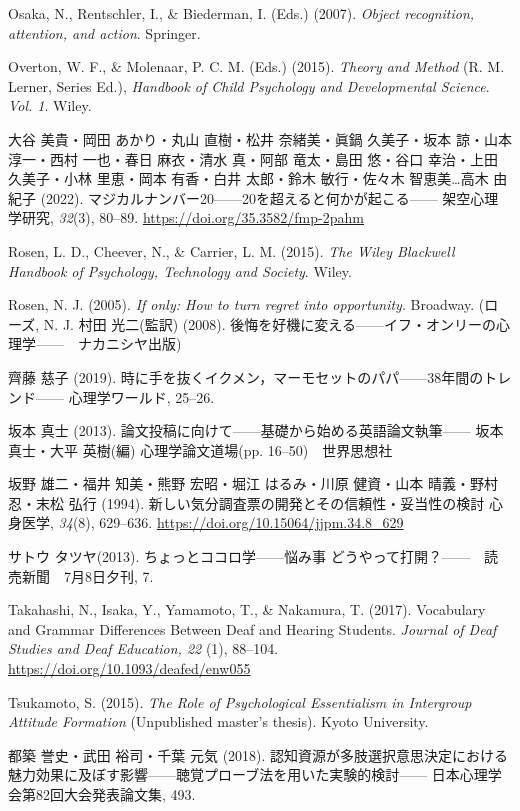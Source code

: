 Osaka, N., Rentschler, I., \& Biederman, I. (Eds.) (2007). \textit{Object recognition, attention, and action}. Springer.

Overton, W. F., \& Molenaar, P. C. M. (Eds.) (2015). \textit{Theory and Method} (R. M. Lerner, Series Ed.), \textit{Handbook of Child Psychology and Developmental Science}. \textit{Vol. 1}. Wiley.

大谷 美貴・岡田 あかり・丸山 直樹・松井 奈緒美・眞鍋 久美子・坂本 諒・山本 淳一・西村 一也・春日 麻衣・清水 真・阿部 竜太・島田 悠・谷口 幸治・上田 久美子・小林 里恵・岡本 有香・白井 太郎・鈴木 敏行・佐々木 智恵美{\ldots}高木 由紀子 (2022). マジカルナンバー20------20を超えると何かが起こる------ 架空心理学研究, \textit{32}(3), 80--89. \url{https://doi.org/35.3582/fmp-2pahm}

Rosen, L. D., Cheever, N., \& Carrier, L. M. (2015). \textit{The Wiley Blackwell Handbook of Psychology, Technology and Society}. Wiley.

Rosen, N. J. (2005). \textit{If only: How to turn regret into opportunity}. Broadway.
(ローズ, N. J. 村田 光二(監訳)  (2008). 後悔を好機に変える------イフ・オンリーの心理学------　ナカニシヤ出版)

齊藤 慈子 (2019). 時に手を抜くイクメン，マーモセットのパパ------38年間のトレンド------ 心理学ワールド, 25--26.

坂本 真士 (2013). 論文投稿に向けて------基礎から始める英語論文執筆------ 坂本 真士・大平 英樹(編) 心理学論文道場(pp. 16--50)　世界思想社

坂野 雄二・福井 知美・熊野 宏昭・堀江 はるみ・川原 健資・山本 晴義・野村 忍・末松 弘行 (1994). 新しい気分調査票の開発とその信頼性・妥当性の検討 心身医学, \textit{34}(8), 629--636. \url{https://doi.org/10.15064/jjpm.34.8_629}

サトウ タツヤ(2013). ちょっとココロ学------悩み事 どうやって打開？------　読売新聞　7月8日夕刊, 7.

Takahashi, N., Isaka, Y., Yamamoto, T., \& Nakamura, T. (2017). Vocabulary and Grammar Differences Between Deaf and Hearing Students. \textit{Journal of Deaf Studies and Deaf Education, 22} (1), 88--104. \url{https://doi.org/10.1093/deafed/enw055}

Tsukamoto, S. (2015). \textit{The Role of Psychological Essentialism in Intergroup Attitude Formation} (Unpublished master's thesis). Kyoto University.

都築 誉史・武田 裕司・千葉 元気 (2018). 認知資源が多肢選択意思決定における魅力効果に及ぼす影響------聴覚プローブ法を用いた実験的検討------ 日本心理学会第82回大会発表論文集, 493.

